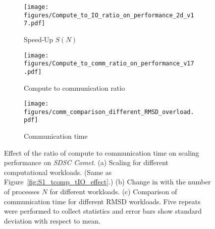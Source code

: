 \begin{figure}[!htb]
  \centering
  \begin{subfigure} {.33\textwidth}
    \texttt{[image: figures/Compute\_to\_IO\_ratio\_on\_performance\_2d\_v17.pdf]}
    \caption{Speed-Up $S(N)$}
    \label{fig:S1_tcomp_tcomm_effect}
  \end{subfigure}
  \hfill
  \begin{subfigure}{.3\textwidth}
    \texttt{[image: figures/Compute\_to\_comm\_ratio\_on\_performance\_v17.pdf]}
    \captionsetup{format=hang}
    \caption{Compute to communication ratio \Rcompcomm}
    \label{fig:tcomp_tcomm_ratio}
  \end{subfigure}
  \hfill
  \begin{subfigure}{.33\textwidth}
    \texttt{[image: figures/comm\_comparison\_different\_RMSD\_overload.pdf]}
    \caption{Communication time \tcomm}
    \label{fig:Comm_time_tcomp_tcomm_effect}
  \end{subfigure}
  \caption{Effect of the ratio of compute to communication time \Rcompcomm on scaling performance on \emph{SDSC Comet}.
    (a) Scaling for different computational workloads. (Same as Figure~\protect\ref{fig:S1_tcomp_tIO_effect}.)
    (b) Change in \Rcompcomm with the number of processes $N$ for different workloads. 
    (c) Comparison of communication time for different RMSD workloads.
    Five repeats were performed to collect statistics and error bars show standard deviation with respect to mean.}
  \label{fig:tcom_tcomm_effect}
\end{figure}


